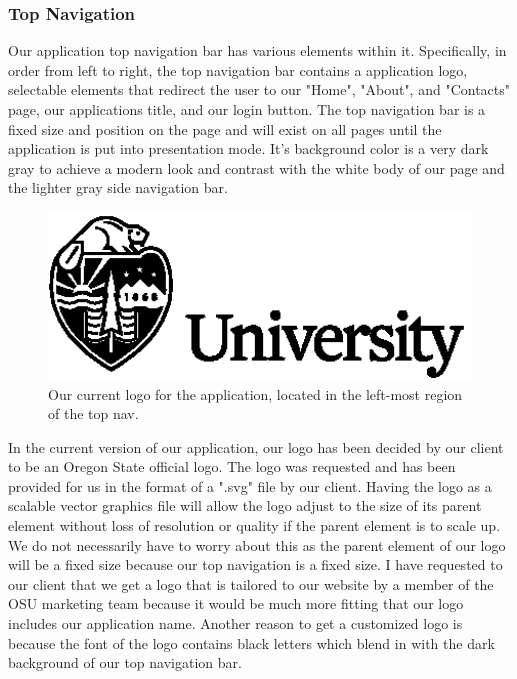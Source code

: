 \documentclass[letterpaper,10pt,serif,draftclsnofoot,onecolumn,compsoc,titlepage]{IEEEtran}
\begin{document}
	\subsubsection{Top Navigation}
	Our application top navigation bar has various elements within it. Specifically, in order from left to right, the top navigation bar contains a application logo, 
	selectable elements that redirect the user to our "Home", "About", and "Contacts" page, our applications title, and our login button. The top navigation bar 
	is a fixed size and position on the page and will exist on all pages until the application is put into presentation mode. It's background color is a very dark gray to achieve
	a modern look and contrast with the white body of our page and the lighter gray side navigation bar. 
	
			\begin{figure}[H]
				\centering
				\includegraphics[width=17cm]{images/logo.eps}
				\caption{Our current logo for the application, located in the left-most region of the top nav.}
			\end{figure}
		
		In the current version of our application, our logo has been decided by our client to be an Oregon State official logo. The logo was requested and has been provided for us 
		in the format of a ".svg" file by our client. Having the logo as a scalable vector graphics file will allow the logo adjust to the size of its parent element without loss 
		of resolution or quality if the parent element is to scale up. We do not necessarily have to worry about this as the parent element of our logo will be a fixed
		size because our top navigation is a fixed size. I have requested to our client that we get a logo that is tailored to our website by a member of the OSU marketing
		team because it would be much more fitting that our logo includes our application name. Another reason to get a customized logo is because the font of the logo contains
		black letters which blend in with the dark background of our top navigation bar.
		
\end{document}
